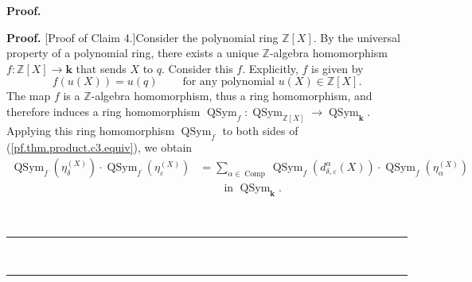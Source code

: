 \documentclass[numbers=enddot,12pt,final,onecolumn,notitlepage]{scrartcl}%
\theoremstyle{definition}
\newenvironment{statement}{\begin{quote}}{\end{quote}}
\newenvironment{proof}[1][Proof]{\noindent\textbf{#1.} }{\ \rule{0.5em}{0.5em}}
\let\sumnonlimits\sum
\renewcommand{\sum}{\sumnonlimits\limits}
\begin{document}
\begin{proof}
\begin{statement}
\end{statement}

\begin{proof}
[Proof of Claim 4.]Consider the polynomial ring $\mathbb{Z}\left[  X\right]
$. By the universal property of a polynomial ring, there exists a unique
$\mathbb{Z}$-algebra homomorphism $f:\mathbb{Z}\left[  X\right]
\rightarrow\mathbf{k}$ that sends $X$ to $q$. Consider this $f$. Explicitly,
$f$ is given by%
\begin{equation}
f\left(  u\left(  X\right)  \right)  =u\left(  q\right)
\ \ \ \ \ \ \ \ \ \ \text{for any polynomial }u\left(  X\right)  \in
\mathbb{Z}\left[  X\right]  . \label{pf.thm.product.c4.fuX}%
\end{equation}
The map $f$ is a $\mathbb{Z}$-algebra homomorphism, thus a ring homomorphism,
and therefore induces a ring homomorphism $\operatorname*{QSym}\nolimits_{f}%
:\operatorname*{QSym}\nolimits_{\mathbb{Z}\left[  X\right]  }\rightarrow
\operatorname*{QSym}\nolimits_{\mathbf{k}}$. Applying this ring homomorphism
$\operatorname*{QSym}\nolimits_{f}$ to both sides of
(\ref{pf.thm.product.c3.equiv}), we obtain%
\begin{align*}
\operatorname*{QSym}\nolimits_{f}\left(  \eta_{\delta}^{\left(  X\right)
}\right)  \cdot\operatorname*{QSym}\nolimits_{f}\left(  \eta_{\varepsilon
}^{\left(  X\right)  }\right)   &  =\sum_{\alpha\in\operatorname*{Comp}%
}\operatorname*{QSym}\nolimits_{f}\left(  d_{\delta,\varepsilon}^{\alpha
}\left(  X\right)  \right)  \cdot\operatorname*{QSym}\nolimits_{f}\left(
\eta_{\alpha}^{\left(  X\right)  }\right) \\
&  \ \ \ \ \ \ \ \ \ \ \text{in }\operatorname*{QSym}\nolimits_{\mathbf{k}}.
\end{align*}



\end{proof}
\end{proof}
\end{document}
